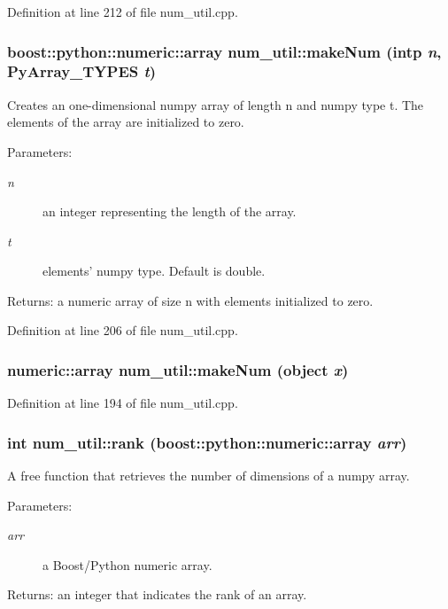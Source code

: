 Definition at line 212 of file num\_\-util.cpp.
\subsubsection{\setlength{\rightskip}{0pt plus 5cm}boost::python::numeric::array num\_\-util::make\-Num (intp {\em n}, Py\-Array\_\-TYPES {\em t})}\label{namespacenum__util_a33}


Creates an one-dimensional numpy array of length n and numpy type t. The elements of the array are initialized to zero. \begin{Desc}
\item[Parameters:]
\begin{description}
\item[{\em n}]an integer representing the length of the array. \item[{\em t}]elements' numpy type. Default is double. \end{description}
\end{Desc}
\begin{Desc}
\item[Returns:]a numeric array of size n with elements initialized to zero.\end{Desc}


Definition at line 206 of file num\_\-util.cpp.
\subsubsection{\setlength{\rightskip}{0pt plus 5cm}numeric::array num\_\-util::make\-Num (object {\em x})}\label{namespacenum__util_a32}




Definition at line 194 of file num\_\-util.cpp.
\subsubsection{\setlength{\rightskip}{0pt plus 5cm}int num\_\-util::rank (boost::python::numeric::array {\em arr})}\label{namespacenum__util_a66}


A free function that retrieves the number of dimensions of a numpy array. \begin{Desc}
\item[Parameters:]
\begin{description}
\item[{\em arr}]a Boost/Python numeric array. \end{description}
\end{Desc}
\begin{Desc}
\item[Returns:]an integer that indicates the rank of an array.\end{Desc}
